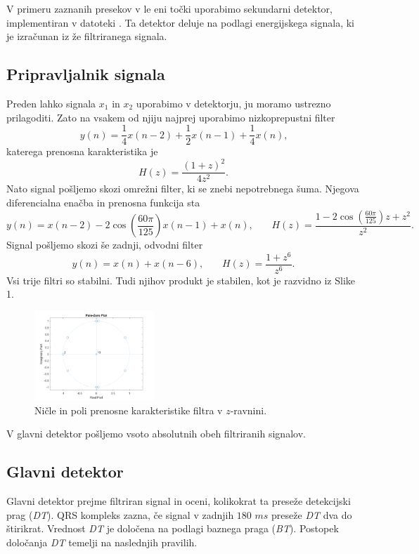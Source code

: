 \documentclass{article}
\begin{document}
    V primeru zaznanih presekov v le eni točki uporabimo sekundarni detektor, implementiran v datoteki . 
    Ta detektor deluje na podlagi energijskega signala, ki je izračunan iz že filtriranega signala. 

    \subsection{Pripravljalnik signala}
    Preden lahko signala $x_1$ in $x_2$ uporabimo v detektorju, ju moramo ustrezno prilagoditi. Zato na vsakem
    od njiju najprej uporabimo nizkoprepustni filter
    $$ y(n) = \frac{1}{4} x(n-2) + \frac{1}{2} x(n-1) + \frac{1}{4} x(n) \text{,}$$
    katerega prenosna karakteristika je 
    $$ H(z) = \frac{(1 + z)^2}{4 z^2} \text{.}$$
    Nato signal pošljemo skozi omrežni filter, ki se znebi nepotrebnega šuma. Njegova diferencialna enačba in prenosna funkcija sta
    $$ y(n) = x(n - 2) - 2 \cos \left( \frac{60 \pi}{125} \right) x(n-1) + x(n)\text{,} \qquad H(z) = \frac{1 - 2 \cos \left( \frac{60 \pi}{125} \right) z + z^2}{z^2} \text{.}$$
    Signal pošljemo skozi še zadnji, odvodni filter
    $$ y(n) = x(n) + x(n - 6)\text{,} \qquad H(z) = \frac{1 + z^6}{z^6}\text{.}$$
    Vsi trije filtri so stabilni. Tudi njihov produkt je stabilen, kot je razvidno iz Slike 1. 
    \begin{figure}[h]
        \centering
        \includegraphics[width=0.4\textwidth]{stabilnost_filtrov.png}
        \caption{Ničle in poli prenosne karakteristike filtra v $z$-ravnini.}
    \end{figure}
    V glavni detektor pošljemo vsoto absolutnih obeh filtriranih signalov. 

    \subsection{Glavni detektor}
    Glavni detektor prejme filtriran signal in oceni, kolikokrat ta preseže detekcijski prag (\emph{DT}). QRS 
    kompleks zazna, če signal v zadnjih $180$ $ms$ preseže \emph{DT} dva do štirikrat. Vrednost \emph{DT} je določena na podlagi 
    baznega praga (\emph{BT}). Postopek določanja \emph{DT} temelji na naslednjih pravilih.
    
\end{document}
